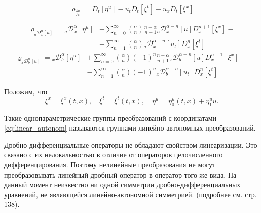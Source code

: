 \documentclass[a4paper, fontsize=14pt]{article}
\newcommand{\RLD}[3]{{}_{#1}\mathcal{D}_{#2}^{\alpha} \left[#3\right]} %
\newcommand{\D}[3]{D_{#1}^{#2} \left[ #3 \right]} %
\newcommand{\RLDa}[4]{{}_{#1}\mathcal{D}_{#2}^{#4} \left[#3\right]} %
\begin{document}
\begin{equation}
  \label{eq:cont_t}
  \varrho_{\frac{\partial u}{\partial t}} = \D{t}{}{\eta^u} - u_t \D{t}{}{\xi^t}- u_x \D{t}{}{\xi^x}
\end{equation}

\begin{equation}
  \label{eq:cont_RL_left}
  \begin{split}\varrho_{\RLD{a}{x}{u}} = \RLD{a}{x}{\eta^u} &+ \sum_{n=0}^{\infty} \binom{\alpha}{n} \frac{n-\alpha}{n+1} \RLDa{a}{x}{u}{\alpha - n} \D{x}{n+1}{\xi^x} - \\
    &- \sum_{n=1}^{\infty} \binom{\alpha}{n} \RLDa{a}{x}{u_t}{\alpha-n} \D{x}{n}{\xi^t}
  \end{split}
\end{equation}
\begin{equation}
  \label{eq:cont_RL_right}
  \begin{split}\varrho_{\RLD{x}{b}{u}} = \RLD{x}{b}{\eta^u} &+ \sum_{n=0}^{\infty} \binom{\alpha}{n} (-1)^n \frac{n-\alpha}{n+1} \RLDa{x}{b}{u}{\alpha - n} \D{x}{n+1}{\xi^x} - \\
    &- \sum_{n=1}^{\infty} \binom{\alpha}{n} (-1)^n \RLDa{x}{b}{u_t}{\alpha-n} \D{x}{n}{\xi^t}
  \end{split}
\end{equation}

Положим, что 
\begin{equation}
  \label{eq:linear_autonom}
  \xi^x = \xi^x(t, x), \quad \xi^t = \xi^t(t, x), \quad \eta^u = \eta_0^u(t, x) + \eta^u_1 u.
\end{equation}

Такие однопараметрические группы преобразований с координатами \eqref{eq:linear_autonom} называются группами линейно-автономных преобразований.

Дробно-дифференциальные операторы не обладают свойством линеаризации. Это связано с их нелокальностью в отличие от операторов целочисленного дифференцирования. Поэтому нелинейные преобразования не могут преобразовывать линейный дробный оператор в оператор того же вида. На данный момент неизвестно ни одной симметрии дробно-дифференциальных уравнений, не являющейся линейно-автономной симметрией. (подробнее см. \cite{luka} стр. 138).
\end{document}
